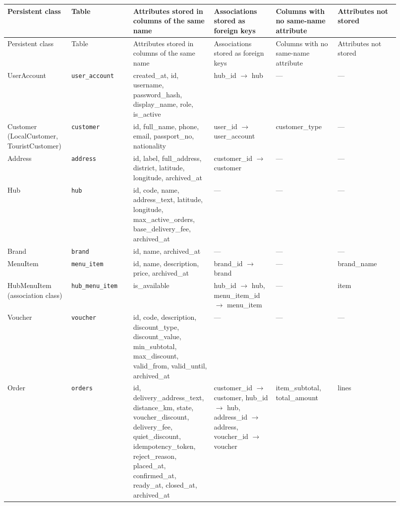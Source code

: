 \begingroup\footnotesize
\begin{longtable}{>{\raggedright\arraybackslash}p{0.1533\linewidth}>{\raggedright\arraybackslash}p{0.1533\linewidth}>{\raggedright\arraybackslash}p{0.1533\linewidth}>{\raggedright\arraybackslash}p{0.1533\linewidth}>{\raggedright\arraybackslash}p{0.1533\linewidth}>{\raggedright\arraybackslash}p{0.1533\linewidth}}
Persistent class & Table & Attributes stored in columns of the same name & Associations stored as foreign keys & Columns with no same-name attribute & Attributes not stored \\
\hline\endfirsthead
Persistent class & Table & Attributes stored in columns of the same name & Associations stored as foreign keys & Columns with no same-name attribute & Attributes not stored \\
\hline\endhead
UserAccount & \texttt{user\_\allowbreak{}account} & created\_at, id, username, password\_hash, display\_name, role, is\_active & hub\_id \ensuremath{\rightarrow} hub & --- & --- \\
Customer (LocalCustomer, TouristCustomer) & \texttt{customer} & id, full\_name, phone, email, passport\_no, nationality & user\_id \ensuremath{\rightarrow} user\_account & customer\_type & --- \\
Address & \texttt{address} & id, label, full\_address, district, latitude, longitude, archived\_at & customer\_id \ensuremath{\rightarrow} customer & --- & --- \\
Hub & \texttt{hub} & id, code, name, address\_text, latitude, longitude, max\_active\_orders, base\_delivery\_fee, archived\_at & --- & --- & --- \\
Brand & \texttt{brand} & id, name, archived\_at & --- & --- & --- \\
MenuItem & \texttt{menu\_\allowbreak{}item} & id, name, description, price, archived\_at & brand\_id \ensuremath{\rightarrow} brand & --- & brand\_name \\
HubMenuItem (association class) & \texttt{hub\_\allowbreak{}menu\_\allowbreak{}item} & is\_available & hub\_id \ensuremath{\rightarrow} hub, menu\_item\_id \ensuremath{\rightarrow} menu\_item & --- & item \\
Voucher & \texttt{voucher} & id, code, description, discount\_type, discount\_value, min\_subtotal, max\_discount, valid\_from, valid\_until, archived\_at & --- & --- & --- \\
Order & \texttt{orders} & id, delivery\_address\_text, distance\_km, state, voucher\_discount, delivery\_fee, quiet\_discount, idempotency\_token, reject\_reason, placed\_at, confirmed\_at, ready\_at, closed\_at, archived\_at & customer\_id \ensuremath{\rightarrow} customer, hub\_id \ensuremath{\rightarrow} hub, address\_id \ensuremath{\rightarrow} address, voucher\_id \ensuremath{\rightarrow} voucher & item\_subtotal, total\_amount & lines \\

\end{longtable}
